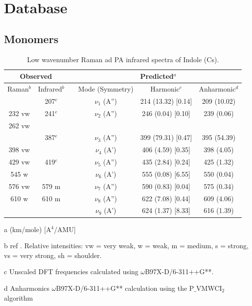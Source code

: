 \chapter[Database]{Database}
\minitoc
\restoregeometry

\newpage
	
	\section{Monomers}
	
	\begin{table}[H]
		\caption{Low wavenumber Raman ad PA infrared spectra of Indole (Cs).}
		\begin{center}
		\begin{threeparttable}
		\begin{tabular}{c c c c c c}
			\hline
			\multicolumn{ 2}{c}{Observed} & \multicolumn{1}{c}{} & \multicolumn{ 3}{c}{Predicted$^{a}$} \\ \hline
			Raman$^{b}$ & \multicolumn{1}{c}{Infrared$^{b}$} &  & \multicolumn{1}{c}{Mode (Symmetry)} & \multicolumn{1}{c}{Harmonic$^{c}$} & Anharmonic$^{d}$ \\ \hline
			& 207$^{e}$ &  & $\nu_{1}$ (A”) & 214 (13.32) [0.14] & 209 (10.02) \\ 
			232 vw & 241$^{e}$ &  &$\nu_{2}$ (A”) & 246 (0.04) [0.10] & 239 (0.06) \\ 
			262 vw &  &  &  &  &  \\ 
			& 387$^{e}$ &  & $\nu_{3}$ (A”) & 399 (79.31) [0.47] & 395 (54.39) \\ 
			398 vw &  &  & $\nu_{4}$ (A’) & 406 (4.59) [0.35] & 398 (4.05) \\ 
			429 vw & 419$^{e}$&  & $\nu_{5}$ (A”) & 435 (2.84) [0.24] & 425 (1.32) \\ 
			545 w &  &  & $\nu_{6}$ (A’) & 555 (0.08) [6.55] & 550 (0.04) \\ 
			576 vw & \multicolumn{1}{c}{579 m} &  & $\nu_{7}$ (A”) & 590 (0.83) [0.04] & 575 (0.34) \\ 
			610 w & \multicolumn{1}{c}{610 m} &  & $\nu_{8}$ (A”)  & 622 (7.08) [0.44] & 609 (4.06) 
			\\ 
			\multicolumn{1}{l}{} &  &  & $\nu_{9}$ (A’)
			& 624 (1.37) [8.33]
			& 616 (1.39)
			\\ \hline
		\end{tabular}
		
			\begin{tablenotes}
				\item[a] (km/mole) [A$^{4}$/AMU]
				\item[b] ref \cite{collier1995heteroatom}. Relative intensities: vw = very weak, w = weak, m = medium, s = strong, vs = very strong, sh = shoulder.
				\item[c] Unscaled DFT frequencies calculated using $\omega$B97X-D/6-311++G**.
				\item[d] Anharmonics $\omega$B97X-D/6-311++G** calculation using the P$\_$VMWCI$_{2}$ algorithm
			\end{tablenotes}
		\end{threeparttable}
	\end{center}
		\label{lowfreq-Indole}
	\end{table}
	
